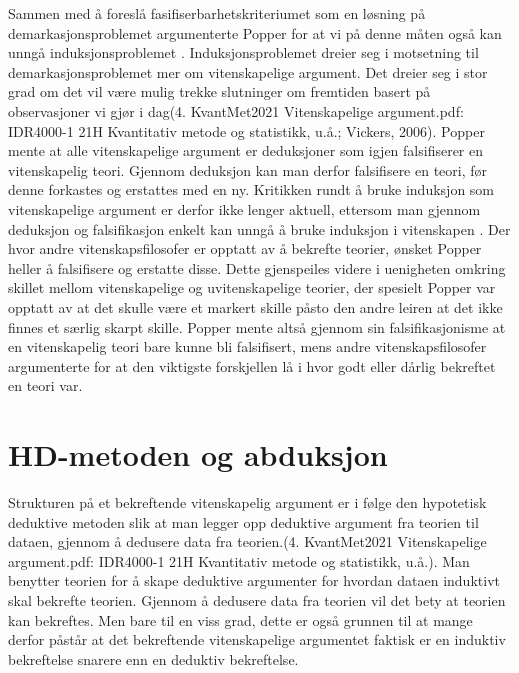 \documentclass[
]{book}
\begin{document}
Sammen med å foreslå fasifiserbarhetskriteriumet som en løsning på demarkasjonsproblemet argumenterte Popper for at vi på denne måten også kan unngå induksjonsproblemet \citep{popper2002, okasha2016, vickers2006}. Induksjonsproblemet dreier seg i motsetning til demarkasjonsproblemet mer om vitenskapelige argument. Det dreier seg i stor grad om det vil være mulig trekke slutninger om fremtiden basert på observasjoner vi gjør i dag(4. KvantMet2021 Vitenskapelige argument.pdf: IDR4000-1 21H Kvantitativ metode og statistikk, u.å.; Vickers, 2006). Popper mente at alle vitenskapelige argument er deduksjoner som igjen falsifiserer en vitenskapelig teori. Gjennom deduksjon kan man derfor falsifisere en teori, før denne forkastes og erstattes med en ny. Kritikken rundt å bruke induksjon som vitenskapelige argument er derfor ikke lenger aktuell, ettersom man gjennom deduksjon og falsifikasjon enkelt kan unngå å bruke induksjon i vitenskapen \citep{popper2002}. Der hvor andre vitenskapsfilosofer er opptatt av å bekrefte teorier, ønsket Popper heller å falsifisere og erstatte disse. Dette gjenspeiles videre i uenigheten omkring skillet mellom vitenskapelige og uvitenskapelige teorier, der spesielt Popper var opptatt av at det skulle være et markert skille påsto den andre leiren at det ikke finnes et særlig skarpt skille. Popper mente altså gjennom sin falsifikasjonisme at en vitenskapelig teori bare kunne bli falsifisert, mens andre vitenskapsfilosofer argumenterte for at den viktigste forskjellen lå i hvor godt eller dårlig bekreftet en teori var.

\hypertarget{hd-metoden-og-abduksjon}{%
\section{HD-metoden og abduksjon}\label{hd-metoden-og-abduksjon}}

Strukturen på et bekreftende vitenskapelig argument er i følge den hypotetisk deduktive metoden slik at man legger opp deduktive argument fra teorien til dataen, gjennom å dedusere data fra teorien.(4. KvantMet2021 Vitenskapelige argument.pdf: IDR4000-1 21H Kvantitativ metode og statistikk, u.å.). Man benytter teorien for å skape deduktive argumenter for hvordan dataen induktivt skal bekrefte teorien. Gjennom å dedusere data fra teorien vil det bety at teorien kan bekreftes. Men bare til en viss grad, dette er også grunnen til at mange derfor påstår at det bekreftende vitenskapelige argumentet faktisk er en induktiv bekreftelse snarere enn en deduktiv bekreftelse.
\end{document}
